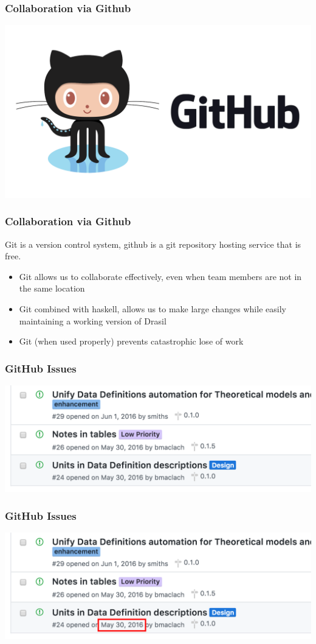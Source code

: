 \documentclass{beamer}
\begin{document}
\begin{frame}
\frametitle{Collaboration via Github}
\centering
\includegraphics[scale=0.2]{./Github_Logo.png}
\end{frame}

\begin{frame}
\frametitle{Collaboration via Github}
Git is a version control system, github is a git repository hosting service that is \alert{free}.
\begin{itemize}
 \item<1-> Git allows us to collaborate effectively, even when team members are not in the same location
 \item<2-> Git combined with haskell, allows us to make large changes while easily maintaining a working version of Drasil
 \item<3-> Git \alert{(when used properly)} prevents catastrophic lose of work
\end{itemize}
\end{frame}

\begin{frame}
\frametitle{GitHub Issues}
\begin{center}
 \includegraphics[scale=0.6]{Old_Issue.png}
\end{center}
\end{frame}

\begin{frame}
\frametitle{GitHub Issues}
\begin{center}
 \includegraphics[scale=0.6]{Old_Issue_With_Box.png}
\end{center}
\end{frame}
\end{document}
